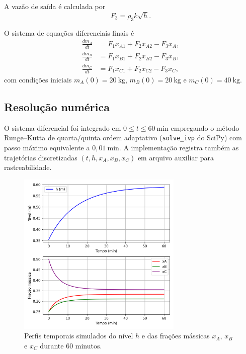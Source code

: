 \documentclass{article}
\begin{document}
A vazão de saída é calculada por
\begin{equation}
  F_3 = \rho_3 k \sqrt{h}. \label{eq:F3-q2}
\end{equation}

O sistema de equações diferenciais finais é
\begin{align}
  \frac{dm_A}{dt} &= F_1 x_{A1} + F_2 x_{A2} - F_3 x_A, \label{eq:balanco-A} \\
  \frac{dm_B}{dt} &= F_1 x_{B1} + F_2 x_{B2} - F_3 x_B, \label{eq:balanco-B} \\
  \frac{dm_C}{dt} &= F_1 x_{C1} + F_2 x_{C2} - F_3 x_C, \label{eq:balanco-C}
\end{align}
com condições iniciais $m_A(0) = 20\ \mathrm{kg}$, $m_B(0) = 20\ \mathrm{kg}$ e $m_C(0) = 40\ \mathrm{kg}$.

\subsection*{Resolução numérica}
O sistema diferencial foi integrado em $0 \leq t \leq 60\ \mathrm{min}$ empregando o método Runge--Kutta de quarta/quinta ordem adaptativo (\texttt{solve\_ivp} do SciPy) com passo máximo equivalente a $0{,}01\ \mathrm{min}$. A implementação registra também as trajetórias discretizadas $(t, h, x_A, x_B, x_C)$ em arquivo auxiliar para rastreabilidade.



\begin{figure}[h!]
  \centering
  \includegraphics[width=0.7\textwidth]{figuras/questao2_tanque.png}
  \caption{Perfis temporais simulados do nível $h$ e das frações mássicas $x_A$, $x_B$ e $x_C$ durante 60 minutos.}
  \label{fig:questao2}
\end{figure}
\end{document}
